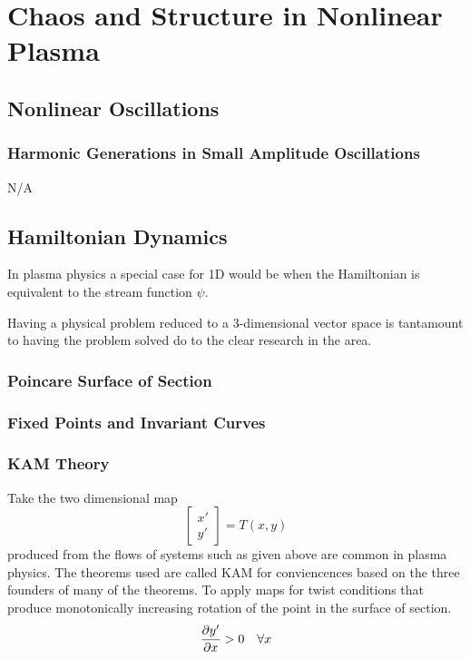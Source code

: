 \chapter{Chaos and Structure in Nonlinear Plasma}

\section{Nonlinear Oscillations}

\subsection{Harmonic Generations in Small Amplitude Oscillations}

N/A

\section{Hamiltonian Dynamics}

In plasma physics a special case for 1D would be when the Hamiltonian is equivalent to the stream function $\psi$.

Having a physical problem reduced to a 3-dimensional vector space is tantamount to having the problem solved do to the clear research in the area.

\subsection{Poincare Surface of Section}

\subsection{Fixed Points and Invariant Curves}



\subsection{KAM Theory}

Take the two dimensional map
\[
\begin{bmatrix}
x' \\
y'
\end{bmatrix}
=
T(x,y)
\]
produced from the flows of systems such as given above are common in plasma physics. The theorems used are called KAM for conviencences based on the three founders of many of the theorems. To apply maps for twist conditions that produce monotonically increasing rotation of the point in the surface of section.
\[
\pdv{y'}{x} > 0 \quad \forall x
  \]

